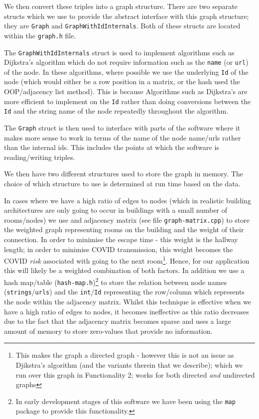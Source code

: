 \documentclass{article}
\begin{document}
We then convert these triples into a graph structure. There are two separate structs which we use to provide the abstract interface with this graph structure; they are \texttt{Graph} and \texttt{GraphWithIdInternals}. Both of these structs are located within the \texttt{graph.h} file.

The \texttt{GraphWithIdInternals} struct is used to implement algorithms such as Dijkstra's algorithm which do not require information such as the \texttt{name} (or \texttt{url}) of the node. In these algorithms, where possible we use the underlying \texttt{Id} of the node (which would either be a row position in a matrix, or the hash used the OOP/adjacency list method). This is because Algorithms such as Dijkstra's are more efficient to implement on the \texttt{Id} rather than doing conversions between the \texttt{Id} and the string name of the node repeatedly throughout the algorithm.

The \texttt{Graph} struct is then used to interface with parts of the software where it makes more sense to work in terms of the name of the node name/urls rather than the internal ids. This includes the points at which the software is reading/writing triples.

We then have two different structures used to store the graph in memory. The choice of which structure to use is determined at run time based on the data.

In cases where we have a high ratio of edges to nodes (which in realistic building architectures are only going to occur in buildings with a small number of rooms/nodes) we use and adjacency matrix (see file \texttt{graph-matrix.cpp}) to store the weighted graph representing rooms on the building and the weight of their connection. In order to minimise the escape time - this weight is the hallway length; in order to minimise COVID transmission, this weight becomes the COVID \textit{risk} associated with going to the next room\footnote{This makes the graph a directed graph - however this is not an issue as Djikstra's algorithm (and the variants therein that we describe); which we run over this graph in Functionality 2; works for both directed \textit{and} undirected graphs}. Hence, for our application this will likely be a weighted combination of both factors.  In addition we use a hash map/table (\texttt{hash-map.h})\footnote{In early development stages of this software we have been using the \texttt{map} package to provide this functionality.} to store the relation between node names (\texttt{strings}/\texttt{urls}) and the \texttt{int}/\texttt{Id} representing the row/column which represents the node within the adjacency matrix. Whilst this technique is effective when we have a high ratio of edges to nodes, it becomes ineffective as this ratio decreases due to the fact that the adjacency matrix becomes sparse and uses a large amount of memory to store zero-values that provide no information.
\end{document}
